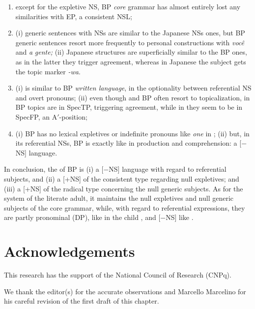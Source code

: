 \documentclass[output=paper]{langsci/langscibook}
\begin{document}
\begin{enumerate}[label=(\alph*)]
\item except for the expletive NS, \gls{BP}
\textit{core} grammar has almost entirely lost any similarities with
\gls{EP}, a consistent \gls{NSL};

\item (i) generic sentences with NSs are similar to the Japanese NSs
ones, but \gls{BP} generic sentences resort more
frequently to personal constructions with \emph{você} and \emph{a}
\emph{gente;} (ii) Japanese  structures are superficially similar to the
\gls{BP} ones,  as in the latter they trigger
agreement, whereas in Japanese the subject gets the topic marker \emph{-wa}.

\item (i)   is similar to \gls{BP} \textit{written language}, in the optionality between referential
NS and overt pronouns; (ii) even  though  and
\gls{BP} often resort to topicalization, in
\gls{BP} topics are in SpecTP, triggering agreement,
while in  they seem to be in SpecFP, an A$'$-position;

\item (i) \gls{BP} has no lexical
expletives or indefinite  pronouns like \emph{one}  in ; (ii) but,
in its referential NSs, \gls{BP} is exactly like
 in production and comprehension: a [$-$NS] language.
\end{enumerate}

In conclusion, the  of \gls{BP} is
(i) a [$-$NS] language with regard to referential subjects, and (ii) a [+NS] of
the consistent type regarding null expletives; and (iii) a [+NS] of the
radical
type concerning the null generic subjects. As for the system of the literate
adult, it maintains the null expletives and null generic subjects of the core
grammar, while, with regard to referential expressions, they are partly
pronominal (DP), like in the child , and [$-$NS] like
.

\printchapterglossary{}

\section*{Acknowledgements}

This research has the support of the National Council of Research (CNPq).

We thank the editor(s) for the accurate observations and Marcello Marcelino for
his careful revision of the first draft of this chapter.

{\sloppy
\printbibliography[heading=subbibliography,notkeyword=this]
}
\end{document}
